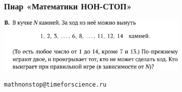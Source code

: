 \begin{frame} \frametitle{Пиар «Математики НОН-СТОП»}
\begin{center}
	\includegraphics[width=0.7\textwidth]{img/mnsgame} \vspace{1cm}
	
	{\large\tt mathnonstop@timeforscience.ru}
\end{center}
\end{frame}

